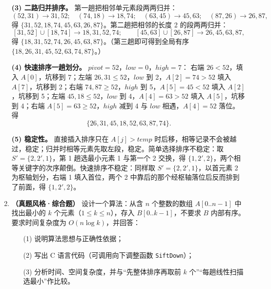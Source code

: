 \begin{enumerate}[start=7]
\textbf{(3) 二路归并排序。} 第一趟把相邻单元素段两两归并：
\[
(52,31)\to31,52;\quad(74,18)\to18,74;\quad(63,45)\to45,63;\quad(87,26)\to26,87,
\]
得 $\{31,52,18,74,45,63,26,87\}$。第二趟把相邻的长度 2 的段两两归并：
\[
[31,52]\cup[18,74]\to18,31,52,74;\qquad[45,63]\cup[26,87]\to26,45,63,87,
\]
得 $\{18,31,52,74,26,45,63,87\}$。（第三趟即可得到全局有序 $\{18,26,31,45,52,63,74,87\}$。）

\textbf{(4) 快速排序一趟划分。} $pivot=52$，$low=0$，$high=7$：
右端 $26<52$，填入 $A[0]$，坑移到 7；左端 $26,31\leqslant52$，$low$ 到 2，$A[2]=74>52$ 填入 $A[7]$，坑移到 2；右端 $74,87\geqslant52$，$high$ 到 5，$A[5]=45<52$ 填入 $A[2]$，坑移到 5；左端 $45,18\leqslant52$，$low$ 到 4，$A[4]=63>52$ 填入 $A[5]$，坑移到 4；右端 $A[5]=63\geqslant52$，$high$ 减到 4 与 $low$ 相遇，$A[4]=52$ 落位。得
\[
\{26,31,45,18,52,63,87,74\}.
\]

\textbf{(5) 稳定性。} 直接插入排序只在 $A[j]>temp$ 时后移，相等记录不会被越过，稳定；归并时相等元素先取左段，稳定。简单选择排序不稳定：取 $S'=\{2,2',1\}$，第 1 趟选最小元素 1 与第一个 2 交换，得 $\{1,2',2\}$，两个相等关键字的次序颠倒。快速排序不稳定：同样取 $S'=\{2,2',1\}$，以首元素 2 为枢轴划分，右端 1 填入首位，两个 2 中靠后的那个经枢轴落位后反而排到了前面，得 $\{1,2',2\}$。

\else \answerarea[10] \fi

\item \textbf{（真题风格·综合题）} 设计一个算法：从含 $n$ 个整数的数组 $A[0..n-1]$ 中找出最小的 $k$ 个元素（$1\leqslant k\leqslant n$），存入 $B[0..k-1]$，不要求 $B$ 内部有序。要求时间复杂度为 $O(n\log k)$，并回答：
\begin{enumerate}
\item[(1)] 说明算法思想与正确性依据；
\item[(2)] 写出 C 语言代码（可调用向下调整函数 \texttt{SiftDown}）；
\item[(3)] 分析时间、空间复杂度，并与“先整体排序再取前 $k$ 个”“每趟线性扫描选最小”作比较。
\end{enumerate}


\end{enumerate}
